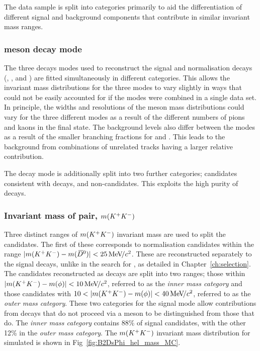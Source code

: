 The data sample is split into categories primarily to aid the differentiation of different signal and background components that contribute in similar invariant mass ranges.

\subsubsection{\Dsp meson decay mode} 
The three \Dsp decays modes used to reconstruct the signal and normalisation decays (\decay{\Dsp}{\Kp\Km\pip}, \decay{\Dsp}{\pip\pim\pip}, and \decay{\Dsp}{\Kp\pim\pip}) are fitted simultaneously in different categories. This allows the invariant mass distributions for the three modes to vary slightly in ways that could not be easily accounted for if the modes were combined in a single data set. In principle, the widths and resolutions of the \Bp meson mass distributions could vary for the three different modes as a result of the different numbers of pions and kaons in the final state. The background levels also differ between the modes as a result of the smaller branching fractions for \decay{\Dsp}{\pip\pim\pip} and \decay{\Dsp}{\Kp\pim\pip}. This leads to the background from combinations of unrelated tracks having a larger relative contribution.

The \decay{\Dsp}{\Kp\Km\pip} decay mode is additionally split into two further categories; candidates consistent with \decay{\Dsp}{\phiz\pip} decays, and non-\phiz candidates. This exploits the high purity of \decay{\Dsp}{\phiz\pip} decays. 

\subsubsection{Invariant mass of \Kp\Km pair, $m({{K}^+}{{K}^-})$} 
Three distinct ranges of $m({{K}^+}{{K}^-})$ invariant mass are used to split the candidates. The first of these corresponds to normalisation \decay{\Bp}{\Dsp\Dzb} candidates within the range $|m({{K}^+}{{K}^-})-m({{\kern 0.2em\overline{\kern -0.2em D}{}}{}^0})|<25 {\mathrm{\,Me\kern -0.1em V\!/}c^2}$. These are reconstructed separately to the signal decays, unlike in the search for \decay{\Bp}{\Dsp\Kp\Km}, as detailed in Chapter~\ref{ch:selection}. The candidates reconstructed as \decay{\Bp}{\Dsp\phiz} decays are split into two ranges; those within $|m({{K}^+}{{K}^-})-m(\phi)|<10{\mathrm{\,Me\kern -0.1em V\!/}c^2}$, referred to as the \emph{inner \phiz mass category} and those candidates with $10<|m(\Kp\Km)-m(\phiz)|<40\mevcc$, referred to as the \emph{outer \phiz mass category}. These two categories for the signal mode allow contributions from decays that do not proceed via a \phiz meson to be distinguished from those that do. The \emph{inner \phiz mass category} contains 88\% of signal \decay{\Bp}{\Dsp\phiz} candidates, with the other 12\% in the \emph{outer \phiz mass category}. The $m({{K}^+}{{K}^-})$ invariant mass distribution for simulated \decay{\Bp}{\Dsp\phiz} is shown in Fig~\ref{fig:B2DsPhi_hel_mass_MC}.



